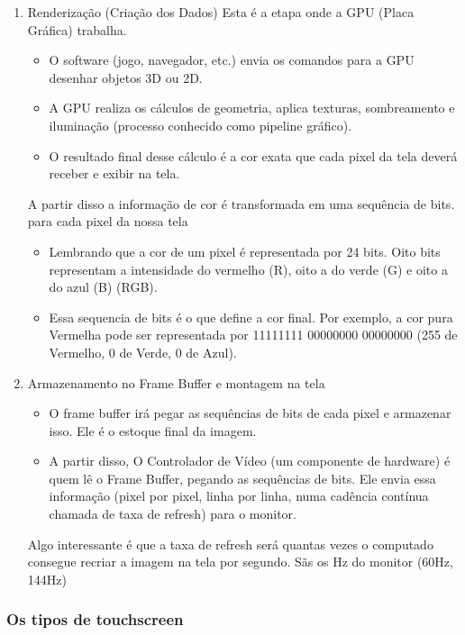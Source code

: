 \documentclass[12pt,a4paper]{report}
\begin{document}
	\begin{enumerate}
		\item Renderização (Criação dos Dados)
		Esta é a etapa onde a GPU (Placa Gráfica) trabalha.
		
		\begin{itemize}
			\item O software (jogo, navegador, etc.) envia os comandos para a GPU desenhar objetos 3D ou 2D.
			
			\item A GPU realiza os cálculos de geometria, aplica texturas, sombreamento e iluminação (processo conhecido como pipeline gráfico).
			\item O resultado final desse cálculo é a cor exata que cada pixel da tela deverá receber e exibir na tela.
			
		\end{itemize}
		A partir disso a informação de cor é transformada em uma sequência de bits. para cada pixel da nossa tela
		
		\begin{itemize}
			\item Lembrando que  a cor de um pixel é representada por 24 bits. Oito bits representam a intensidade do vermelho (R), oito a do verde (G) e oito a do azul (B) (RGB).
			\item Essa sequencia de bits é o que define a cor final. Por exemplo, a cor pura Vermelha pode ser representada por 11111111 00000000 00000000 (255 de Vermelho, 0 de Verde, 0 de Azul).
		\end{itemize}
		
		\item Armazenamento no Frame Buffer e montagem na tela
		\begin{itemize}
			\item O frame buffer  irá pegar as sequências de bits de cada pixel e armazenar isso. Ele é o estoque final da imagem.
			\item A partir disso, O Controlador de Vídeo (um componente de hardware) é quem lê o Frame Buffer, pegando as sequências de bits. Ele envia essa informação (pixel por pixel, linha por linha, numa cadência contínua chamada de taxa de refresh) para o monitor.
		\end{itemize}
		Algo interessante é que a taxa de refresh será quantas vezes o computado consegue recriar a imagem na tela por segundo. Sãs os Hz do monitor (60Hz, 144Hz)
	\end{enumerate}
	
	
	\subsubsection{Os tipos de touchscreen}
	
\end{document}
